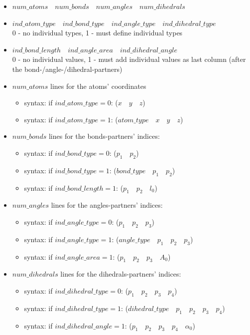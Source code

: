 \documentclass[a4paper,10pt]{scrreprt}
\begin{document}
\begin{itemize}
\item $num\_atoms \quad num\_bonds \quad num\_angles \quad num\_dihedrals$
\item $ind\_atom\_type \quad ind\_bond\_type \quad ind\_angle\_type \quad ind\_dihedral\_type$\\
	{0 - no individual types, 1 - must define individual types}
\item $ind\_bond\_length \quad ind\_angle\_area \quad ind\_dihedral\_angle$\\
	{0 - no individual values, 1 - must add individual values as last column (after the bond-/angle-/dihedral-partners)}
\item $num\_atoms$ lines for the atoms' coordinates
	\begin{itemize}
	\item syntax: if $ind\_atom\_type=0$: ($x \quad y \quad z$)
	\item syntax: if $ind\_atom\_type=1$: ($atom\_type \quad x \quad y \quad z$)
	\end{itemize}
\item $num\_bonds$ lines for the bonds-partners' indices:
	\begin{itemize}
	\item syntax: if $ind\_bond\_type=0$: ($p_1 \quad p_2$)
	\item syntax: if $ind\_bond\_type=1$: ($bond\_type \quad p_1 \quad p_2$)
	\item syntax: if $ind\_bond\_length=1$: ($p_1 \quad p_2 \quad l_0$)
	\end{itemize}
\item $num\_angles$ lines for the angles-partners' indices:
	\begin{itemize}
	\item syntax: if $ind\_angle\_type=0$: ($p_1 \quad p_2 \quad p_3$)
	\item syntax: if $ind\_angle\_type=1$: ($angle\_type \quad p_1 \quad p_2 \quad p_3$)
	\item syntax: if $ind\_angle\_area=1$: ($p_1 \quad p_2 \quad p_3 \quad A_0$)
	\end{itemize}
\item $num\_dihedrals$ lines for the dihedrals-partners' indices:
	\begin{itemize}
	\item syntax: if $ind\_dihedral\_type=0$: ($p_1 \quad p_2 \quad p_3 \quad p_4$)
	\item syntax: if $ind\_dihedral\_type=1$: ($dihedral\_type \quad p_1 \quad p_2 \quad p_3 \quad p_4$)
	\item syntax: if $ind\_dihedral\_angle=1$: ($p_1 \quad p_2 \quad p_3 \quad p_4 \quad \alpha_0$)
	\end{itemize}
\end{itemize}

 

\end{document}
